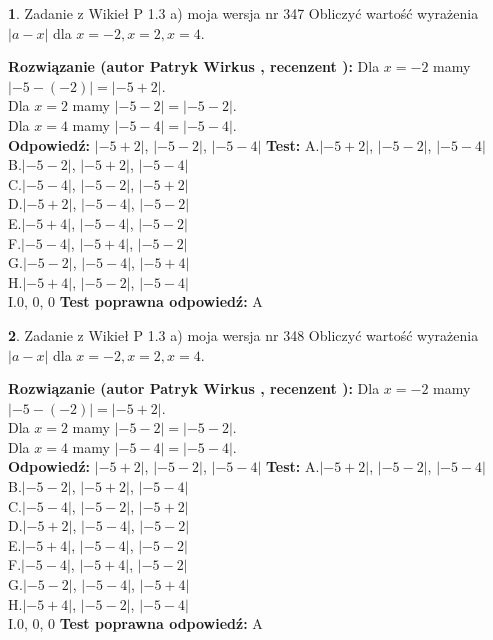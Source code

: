 \documentclass[12pt, a4paper]{article}
\theoremstyle{definition} %
\newtheorem{zad}{}
\newcommand{\zadStart}[1]{\begin{zad}#1\newline}
\newcommand{\zadStop}{\end{zad}}
\newcommand{\rozwStart}[2]{\noindent \textbf{Rozwiązanie (autor #1 , recenzent #2): }\newline}
\newcommand{\rozwStop}{\newline}
\newcommand{\odpStart}{\noindent \textbf{Odpowiedź:}\newline}
\newcommand{\odpStop}{\newline}
\newcommand{\testStart}{\noindent \textbf{Test:}\newline}
\newcommand{\testStop}{\newline}
\newcommand{\kluczStart}{\noindent \textbf{Test poprawna odpowiedź:}\newline}
\newcommand{\kluczStop}{\newline}
\begin{document}
\zadStart{Zadanie z Wikieł P 1.3 a) moja wersja nr 347}
Obliczyć wartość wyrażenia $|a - x|$ dla $x=-2,x=2,x=4$.
\zadStop
\rozwStart{Patryk Wirkus}{}
Dla $x = -2$ mamy $|-5 - (-2)| = |-5 + 2|$.\\
Dla $x = 2$ mamy $|-5 - 2| = |-5 - 2|$.\\
Dla $x = 4$ mamy $|-5 - 4| = |-5 - 4|$.\\
\rozwStop
\odpStart
$|-5 + 2|$, $|-5 - 2|$, $|-5 - 4|$
\odpStop
\testStart
A.$|-5 + 2|$, $|-5 - 2|$, $|-5 - 4|$\\
B.$|-5 - 2|$, $|-5 + 2|$, $|-5 - 4|$\\
C.$|-5 - 4|$, $|-5 - 2|$, $|-5 + 2|$\\
D.$|-5 + 2|$, $|-5 - 4|$, $|-5 - 2|$\\
E.$|-5 + 4|$, $|-5 - 4|$, $|-5 - 2|$\\
F.$|-5 - 4|$, $|-5 + 4|$, $|-5 - 2|$\\
G.$|-5 - 2|$, $|-5 - 4|$, $|-5 + 4|$\\
H.$|-5 + 4|$, $|-5 - 2|$, $|-5 - 4|$\\
I.$0$, $0$, $0$
\testStop
\kluczStart
A
\kluczStop



\zadStart{Zadanie z Wikieł P 1.3 a) moja wersja nr 348}
Obliczyć wartość wyrażenia $|a - x|$ dla $x=-2,x=2,x=4$.
\zadStop
\rozwStart{Patryk Wirkus}{}
Dla $x = -2$ mamy $|-5 - (-2)| = |-5 + 2|$.\\
Dla $x = 2$ mamy $|-5 - 2| = |-5 - 2|$.\\
Dla $x = 4$ mamy $|-5 - 4| = |-5 - 4|$.\\
\rozwStop
\odpStart
$|-5 + 2|$, $|-5 - 2|$, $|-5 - 4|$
\odpStop
\testStart
A.$|-5 + 2|$, $|-5 - 2|$, $|-5 - 4|$\\
B.$|-5 - 2|$, $|-5 + 2|$, $|-5 - 4|$\\
C.$|-5 - 4|$, $|-5 - 2|$, $|-5 + 2|$\\
D.$|-5 + 2|$, $|-5 - 4|$, $|-5 - 2|$\\
E.$|-5 + 4|$, $|-5 - 4|$, $|-5 - 2|$\\
F.$|-5 - 4|$, $|-5 + 4|$, $|-5 - 2|$\\
G.$|-5 - 2|$, $|-5 - 4|$, $|-5 + 4|$\\
H.$|-5 + 4|$, $|-5 - 2|$, $|-5 - 4|$\\
I.$0$, $0$, $0$
\testStop
\kluczStart
A
\kluczStop
\end{document}
